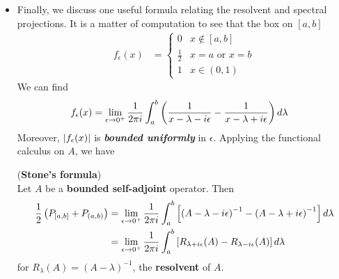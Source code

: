 \documentclass[11pt]{article}
\begin{document}
\begin{itemize}
\item \begin{remark}
Finally, we discuss one useful formula relating the resolvent and spectral projections. It is a matter of computation to see that the box on $[a,b]$
\begin{align*}
f_{\epsilon}(x) &= \left\{ \begin{array}{cc}
0 & x \not\in [a, b]\\
\frac{1}{2} & x=a \text{ or }x=b\\
1 & x \in (0,1)
\end{array}
\right.
\end{align*} We can find 
\begin{align*}
f_{\epsilon}(x) &= \lim\limits_{\epsilon \rightarrow 0^{+}}\frac{1}{2\pi i} \int_{a}^{b}\left(\frac{1}{x- \lambda - i \epsilon} - \frac{1}{x - \lambda + i\epsilon}\right) d\lambda
\end{align*} Moreover,  $\left\lvert f_{\epsilon}(x) \right\rvert$ is \emph{\textbf{bounded uniformly}} in $\epsilon$. Applying the functional calculus on $A$, we have
\end{remark}

\begin{theorem} (\textbf{Stone's formula}) \citep{reed1980methods}\\
 Let $A$ be a \textbf{bounded self-adjoint} operator. Then 
 \begin{align}
 \frac{1}{2}\left(P_{[a, b]} + P_{(a,b)}\right) &= \lim\limits_{\epsilon \rightarrow 0^{+}}\frac{1}{2\pi i} \int_{a}^{b}\left[\left(A- \lambda - i \epsilon\right)^{-1} - \left(A - \lambda + i\epsilon\right)^{-1}\right] d\lambda \label{eqn: stone_formula} \\
 &=  \lim\limits_{\epsilon \rightarrow 0^{+}}\frac{1}{2\pi i} \int_{a}^{b}\left[R_{\lambda + i \epsilon}(A) - R_{\lambda - i \epsilon}(A)\right] d\lambda \nonumber
 \end{align} for $R_{\lambda}(A) = (A - \lambda)^{-1}$, the \textbf{resolvent} of $A$.
\end{theorem}
\end{itemize}


\newpage


\end{document}
